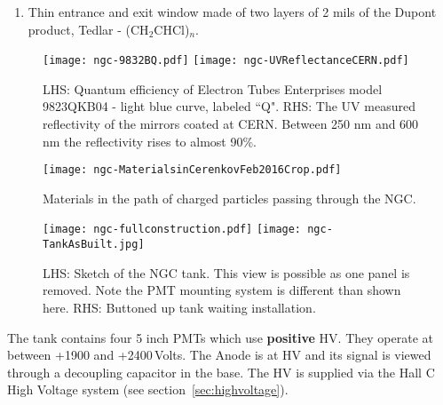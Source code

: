 {\begin{enumerate}
 The PMTs are model 9823QKB04 and tubes with serial numbers 16747,
 16777, 16787 and 16785 are installed to accept light from the mirrors
 in position Top Right, Top Left, Bottom Right and Bottom Left
 respectively while looking along increasing $z$. The tubes are
 surrounded by a mu-metal shield and the HV is distributed to the
 stages by a positive base.
\item Thin entrance and exit window made of two layers of 2 mils of
  the Dupont product, Tedlar - (CH$_2$CHCl)$_n$.
\end{enumerate}
\begin{figure}[!h] %
   \centering
   \texttt{[image: ngc-9832BQ.pdf]}
   \texttt{[image: ngc-UVReflectanceCERN.pdf]}
   \caption{
     LHS: Quantum efficiency of Electron Tubes Enterprises model 9823QKB04
     - light blue curve, labeled ``Q".
     RHS: The UV measured reflectivity of the mirrors coated at CERN. Between
     250 nm and 600 nm the reflectivity rises to almost 90\%.
   \label{fig:tubeandmirror}}
\end{figure}

\begin{figure}[!h] %
   \centering
   \texttt{[image: ngc-MaterialsinCerenkovFeb2016Crop.pdf]}
   \caption{
     Materials in the path of charged particles passing through the NGC.
   }
   \label{fig:materials}
\end{figure}

\begin{figure}[!h] %
   \centering
   \texttt{[image: ngc-fullconstruction.pdf]}
   \texttt{[image: ngc-TankAsBuilt.jpg]}
   \caption{LHS: Sketch of the NGC tank. This view is possible as one
     panel is removed. Note the PMT mounting system is different than
     shown here.  RHS: Buttoned up tank waiting
     installation.\label{fig:Box}}

\end{figure}

\vspace{.25in}

The tank contains four 5 inch PMTs which use {\bf positive} HV. They
operate at between +1900 and +2400\,Volts. The Anode is at HV and its
signal is viewed through a decoupling capacitor in the base.  The
HV is supplied via the Hall C High Voltage system (see
section~\ref{sec:highvoltage}).

}
